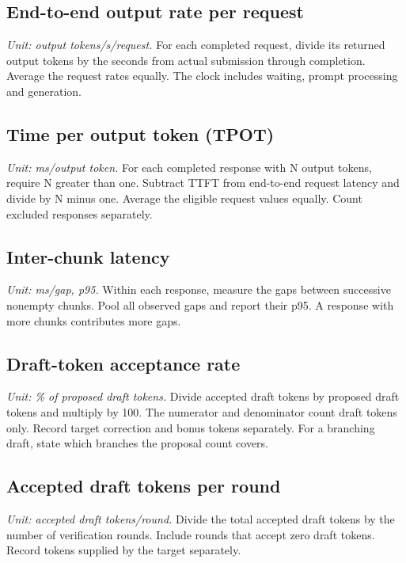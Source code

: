 \subsection{End-to-end output rate per request}

\textit{Unit: output tokens/s/request.} For each completed request, divide its returned output tokens by the seconds from actual submission through completion. Average the request rates equally. The clock includes waiting, prompt processing and generation.

\subsection{Time per output token (TPOT)}

\textit{Unit: ms/output token.} For each completed response with N output tokens, require N greater than one. Subtract TTFT from end-to-end request latency and divide by N minus one. Average the eligible request values equally. Count excluded responses separately.

\subsection{Inter-chunk latency}

\textit{Unit: ms/gap, p95.} Within each response, measure the gaps between successive nonempty chunks. Pool all observed gaps and report their p95. A response with more chunks contributes more gaps.

\subsection{Draft-token acceptance rate}

\textit{Unit: \% of proposed draft tokens.} Divide accepted draft tokens by proposed draft tokens and multiply by 100. The numerator and denominator count draft tokens only. Record target correction and bonus tokens separately. For a branching draft, state which branches the proposal count covers.

\subsection{Accepted draft tokens per round}

\textit{Unit: accepted draft tokens/round.} Divide the total accepted draft tokens by the number of verification rounds. Include rounds that accept zero draft tokens. Record tokens supplied by the target separately.

